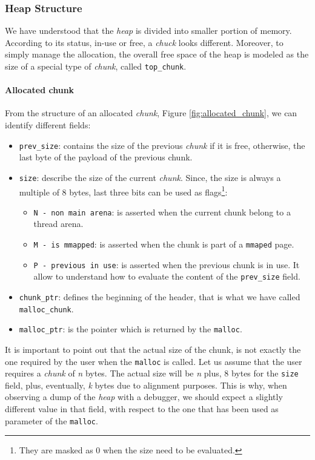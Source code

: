 \documentclass{article}
\numberwithin{equation}{subsection}
\begin{document}
\subsubsection{Heap Structure}
We have understood that the \emph{heap} is divided into smaller portion of memory. According to its status, in-use or free, a \emph{chuck} looks different. Moreover, to simply manage the allocation, the overall free space of the heap is modeled as the size of a special type of \emph{chunk}, called \texttt{top\_chunk}.
\paragraph{Allocated chunk}
From the structure of an allocated \emph{chunk}, Figure \ref{fig:allocated_chunk}, we can identify different fields:
\begin{itemize}
    \item \texttt{prev\_size}: contains the size of the previous \emph{chunk} if it is free, otherwise, the last byte of the payload of the previous chunk.
    \item \texttt{size}: describe the size of the current \emph{chunk}. Since, the size is always a multiple of 8 bytes, last three bits can be used as flags\footnote{They are masked as 0 when the size need to be evaluated.}:\begin{itemize}
        \item \texttt{N - non main arena}: is asserted when the current chunk belong to a thread arena.
        \item \texttt{M - is mmapped}: is asserted when the chunk is part of a \texttt{mmaped} page.
        \item \texttt{P - previous in use}: is asserted when the previous chunk is in use. It allow to understand how to evaluate the content of the \texttt{prev\_size} field.
    \end{itemize}
    \item \texttt{chunk\_ptr}: defines the beginning of the header, that is what we have called \texttt{malloc\_chunk}.
    \item \texttt{malloc\_ptr}: is the pointer which is returned by the \texttt{malloc}.
\end{itemize}
It is important to point out that the actual size of the chunk, is not exactly the one required by the user when the \texttt{malloc} is called. Let us assume that the user requires a \emph{chunk} of \emph{n} bytes. The actual size will be \emph{n} plus, 8 bytes for the \texttt{size} field, plus, eventually, \emph{k} bytes due to alignment purposes. This is why, when observing a dump of the \emph{heap} with a debugger, we should expect a slightly different value in that field, with respect to the one that has been used as parameter of the \texttt{malloc}.
\end{document}
